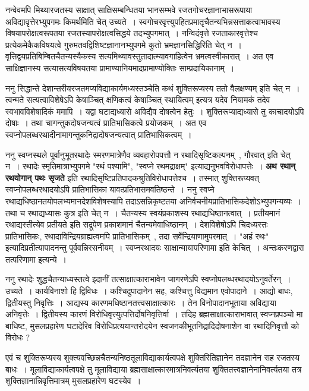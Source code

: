 	नन्वेवमपि मिथ्यारजतस्य साक्षात् साक्षिसम्बन्धितया भानसम्भवे रजतगोचरज्ञानाभासरूपाया अविद्यावृत्तेरभ्युपगमः किमर्थमिति चेत् उच्यते~। स्वगोचरवृत्त्युपहितप्रमातृचैतन्यभिन्नसत्ताकत्वाभावस्य विषयापरोक्षत्वरूपतया रजतस्यापरोक्षत्वसिद्धये तदभ्युपगमात्~। नन्विदंवृत्ते रजताकारवृत्तेश्च प्रत्येकमेकैकविषयत्वे गुरुमतवद्विशिष्टज्ञानानभ्युपगमे कुतो भ्रमज्ञानसिद्धिरिति चेत् न~। वृत्तिद्वयप्रतिबिम्बितचैतन्यस्यैकस्य सत्यमिथ्यावस्तुतादात्म्यावगाहित्वेन भ्रमत्वस्वीकारात्~। अत एव साक्षिज्ञानस्य सत्यासत्यविषयतया प्रामाण्यानियमादप्रामाण्योक्तिः साम्प्रदायिकानाम्~।\par
	ननु सिद्धान्ते देशान्तरीयरजतमप्यविद्याकार्यमध्यस्तञ्चेति कथं शुक्तिरूप्यस्य ततो वैलक्षण्यम् इति चेत् न~। त्वन्मते सत्यत्वाविशेषेऽपि केषाञ्चित् क्षणिकत्वं केषाञ्चित् स्थायित्वम् इत्यत्र यदेव नियामकं तदेव स्वभावविशेषादिकं ममापि~। यद्वा घटाद्यध्यासे अविद्यैव दोषत्वेन हेतुः~। शुक्तिरूप्याद्यध्यासे तु काचादयोऽपि दोषाः~। तथा चागन्तुकदोषजन्यत्वं प्रातिभासिकत्वे प्रयोजकम्~। अत एव स्वप्नोपलब्धरथादीनामागन्तुकनिद्रादोषजन्यत्वात् प्रातिभासिकत्वम्~।\par
	ननु स्वप्नस्थले पूर्वानुभूतरथादेः स्मरणमात्रेणैव व्यवहारोपपत्तौ न रथादिसृष्टिकल्पनम्~, गौरवात् इति चेत् न~। रथादेः स्मृतिमात्राभ्युपगमे "रथं पश्यामि", "स्वप्ने रथमद्राक्षम्" इत्याद्यनुभवविरोधापत्तेः~। {\bfseries अथ रथान् रथयोगान् पथः सृजते} इति रथादिसृष्टिप्रतिपादकश्रुतिविरोधापत्तेश्च~। तस्मात् शुक्तिरूप्यवत् स्वप्नोपलब्धरथादयोऽपि प्रातिभासिका यावत्प्रतिभासमवतिष्ठन्ते~। ननु स्वप्ने रथाद्यधिष्ठानतयोपलभ्यमानदेशविशेषस्यापि तदाऽसन्निकृष्टतया अनिर्वचनीयप्रातिभासिकदेशोऽभ्युपगन्यव्यः~। तथा च रथाद्यध्यासः कुत्र इति चेत् न~। चैतन्यस्य स्वयंप्रकाशस्य रथाद्यधिष्ठानत्वात्~। प्रतीयमानं रथाद्यस्तीत्येव प्रतीयते इति सद्रूपेण प्रकाशमानं चैतन्यमेवाधिष्ठानम्~। देशविशेषोऽपि चिदध्यस्तः प्रातिभासिकः, रथादाविन्द्रियग्राह्यत्वमपि प्रातिभासिकम्~, तदा सर्वेन्द्रियाणामुपरमात्~। "अहं रथः" इत्यादिप्रतीत्यापादनन्तु पूर्ववन्निरसनीयम्~। स्वप्नरथादयः साक्षान्मायापरिणामा इति केचित्~। अन्तःकरणद्वारा तत्परिणामा इत्यन्ये~। \par
	ननु रथादेः शुद्धचैतन्याध्यस्तत्वे इदानीं तत्साक्षात्काराभावेन जागरणेऽपि स्वप्नोपलब्धरथादयोऽनुवर्तेरन्~। उच्यते~। कार्यविनाशो हि द्विविधः~। कश्चिदुपादानेन सह, कश्चित्तु विद्यमान एवोपादाने~। आद्यो बाधः, द्वितीयस्तु निवृत्तिः~। आद्यस्य कारणमधिष्ठानतत्त्वसाक्षात्कारः~। तेन विनोपादानभूताया अविद्याया अनिवृत्तेः~। द्वितीयस्य कारणं विरोधिवृत्त्युत्पत्तिर्दोषनिवृत्तिर्वा~। तदिह ब्रह्मसाक्षात्काराभावात् स्वप्नप्रपञ्चो मा बाधिष्ट, मुसलप्रहारेण घटादेरिव विरोधिप्रत्ययान्तरोदयेन स्वजनकीभूतनिद्रादिदोषनाशेन वा रथादिनिवृत्तौ को विरोधः ?\par
	एवं च शुक्तिरूप्यस्य शुक्त्यवच्छिन्नचैतन्यनिष्ठतूलाविद्याकार्यत्वपक्षे शुक्तिरितिज्ञानेन तदज्ञानेन सह रजतस्य बाधः~। मूलाविद्याकार्यत्वपक्षे तु मूलाविद्याया ब्रह्मसाक्षात्कारमात्रनिवर्त्यतया शुक्तितत्त्वज्ञानेनानिवर्त्यतया तत्र शुक्तिज्ञानान्निवृत्तिमात्रम् मुसलप्रहारेण घटस्येव~। \par
